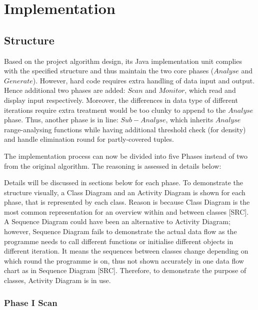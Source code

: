 \chapter{Implementation}

\section{Structure}
Based on the project algorithm design, its Java implementation unit complies with the specified structure and thus maintain the two core phases ($Analyse$ and $Generate$). However, hard code requires extra handling of data input and output. Hence additional two phases are added: $Scan$ and $Monitor$, which read and display input respectively. Moreover, the differences in data type of different iterations require extra treatment would be too clunky to append to the $Analyse$ phase. Thus, another phase is in line: $Sub-Analyse$, which inherits $Analyse$ range-analysing functions while having additional threshold check (for density) and handle elimination round for partly-covered tuples.  

The implementation process can now be divided into five Phases instead of two from the original algorithm. The reasoning is assessed in details below:




Details will be discussed in sections below for each phase. To demonstrate the structure visually, a Class Diagram and an Activity Diagram is shown for each phase, that is represented by each class. Reason is because Class Diagram is the most common representation for an overview within and between classes [SRC]. A Sequence Diagram could have been an alternative to Activity Diagram; however, Sequence Diagram fails to demonstrate the actual data flow as the programme needs to call different functions or initialise different objects in different iteration. It means the sequences between classes change depending on which round the programme is on, thus not shown accurately in one data flow chart as in Sequence Diagram [SRC]. Therefore, to demonstrate the purpose of classes, Activity Diagram is in use.

\subsection{Phase I Scan}

